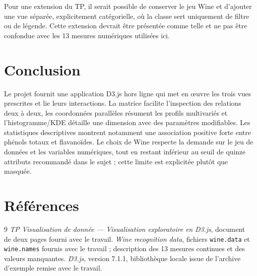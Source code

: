 \documentclass[11pt,a4paper]{article}
\begin{document}
Pour une extension du TP, il serait possible de conserver le jeu Wine et d'ajouter une vue séparée, explicitement catégorielle, où la classe sert uniquement de filtre ou de légende. Cette extension devrait être présentée comme telle et ne pas être confondue avec les 13 mesures numériques utilisées ici.

\section{Conclusion}
Le projet fournit une application D3.js hors ligne qui met en œuvre les trois vues prescrites et lie leurs interactions. La matrice facilite l'inspection des relations deux à deux, les coordonnées parallèles résument les profils multivariés et l'histogramme/KDE détaille une dimension avec des paramètres modifiables. Les statistiques descriptives montrent notamment une association positive forte entre phénols totaux et flavanoïdes. Le choix de Wine respecte la demande sur le jeu de données et les variables numériques, tout en restant inférieur au seuil de quinze attributs recommandé dans le sujet ; cette limite est explicitée plutôt que masquée.

\section*{Références}
\begin{thebibliography}{9}
   \textit{TP Visualisation de donnée — Visualisation exploratoire en D3.js}, document de deux pages fourni avec le travail.
   \textit{Wine recognition data}, fichiers \texttt{wine.data} et \texttt{wine.names} fournis avec le travail ; description des 13 mesures continues et des valeurs manquantes.
   \textit{D3.js}, version 7.1.1, bibliothèque locale issue de l'archive d'exemple remise avec le travail.
\end{thebibliography}
\end{document}
